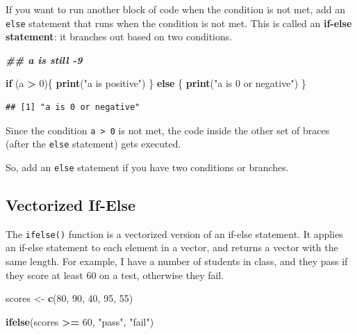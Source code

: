 \documentclass[
]{book}
\newenvironment{Shaded}{\begin{snugshade}}{\end{snugshade}}
\newcommand{\ControlFlowTok}[1]{\textcolor[rgb]{0.13,0.29,0.53}{\textbf{#1}}}
\newcommand{\DecValTok}[1]{\textcolor[rgb]{0.00,0.00,0.81}{#1}}
\newcommand{\DocumentationTok}[1]{\textcolor[rgb]{0.56,0.35,0.01}{\textbf{\textit{#1}}}}
\newcommand{\FunctionTok}[1]{\textcolor[rgb]{0.13,0.29,0.53}{\textbf{#1}}}
\newcommand{\NormalTok}[1]{#1}
\newcommand{\OtherTok}[1]{\textcolor[rgb]{0.56,0.35,0.01}{#1}}
\newcommand{\SpecialCharTok}[1]{\textcolor[rgb]{0.81,0.36,0.00}{\textbf{#1}}}
\newcommand{\StringTok}[1]{\textcolor[rgb]{0.31,0.60,0.02}{#1}}
\theoremstyle{definition}
\theoremstyle{definition}
\theoremstyle{definition}
\theoremstyle{definition}
\theoremstyle{remark}
\begin{document}
If you want to run another block of code when the condition is not met, add an \texttt{else} statement that runs when the condition is not met. This is called an \textbf{if-else statement}: it branches out based on two conditions.

\begin{Shaded}
\begin{Highlighting}[]
\DocumentationTok{\#\# a is still {-}9}

\ControlFlowTok{if}\NormalTok{ (a }\SpecialCharTok{\textgreater{}} \DecValTok{0}\NormalTok{)\{}
  \FunctionTok{print}\NormalTok{(}\StringTok{"a is positive"}\NormalTok{)}
\NormalTok{\} }\ControlFlowTok{else}\NormalTok{ \{}
  \FunctionTok{print}\NormalTok{(}\StringTok{"a is 0 or negative"}\NormalTok{)}
\NormalTok{\}}
\end{Highlighting}
\end{Shaded}

\begin{verbatim}
## [1] "a is 0 or negative"
\end{verbatim}

Since the condition \texttt{a\ \textgreater{}\ 0} is not met, the code inside the other set of braces (after the \texttt{else} statement) gets executed.

So, add an \texttt{else} statement if you have two conditions or branches.

\hypertarget{vectorized-if-else}{%
\subsection{Vectorized If-Else}\label{vectorized-if-else}}

The \texttt{ifelse()} function is a vectorized version of an if-else statement. It applies an if-else statement to each element in a vector, and returns a vector with the same length. For example, I have a number of students in class, and they pass if they score at least 60 on a test, otherwise they fail.

\begin{Shaded}
\begin{Highlighting}[]
\NormalTok{scores }\OtherTok{\textless{}{-}} \FunctionTok{c}\NormalTok{(}\DecValTok{80}\NormalTok{, }\DecValTok{90}\NormalTok{, }\DecValTok{40}\NormalTok{, }\DecValTok{95}\NormalTok{, }\DecValTok{55}\NormalTok{)}

\FunctionTok{ifelse}\NormalTok{(scores }\SpecialCharTok{\textgreater{}=} \DecValTok{60}\NormalTok{, }\StringTok{"pass"}\NormalTok{, }\StringTok{"fail"}\NormalTok{)}
\end{Highlighting}
\end{Shaded}
\end{document}
